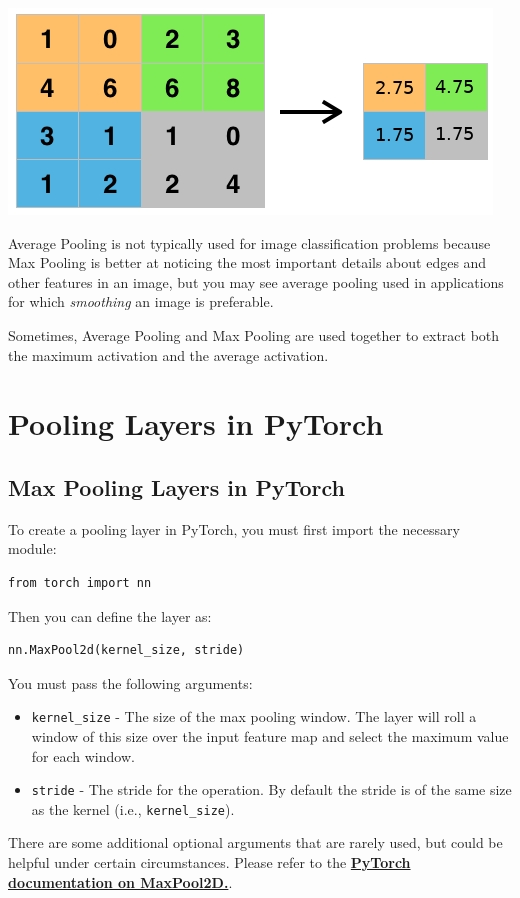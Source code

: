 \includegraphics[width=0.75\linewidth]{img//cnn//depth/average-pooling.jpeg}

Average Pooling is not typically used for image classification problems because Max Pooling is better at noticing the most important details about edges and other features in an image, but you may see average pooling used in applications for which \textit{smoothing} an image is preferable. \newline

Sometimes, Average Pooling and Max Pooling are used together to extract both the maximum activation and the average activation.

\section{Pooling Layers in PyTorch}

\subsection{Max Pooling Layers in PyTorch}

To create a pooling layer in PyTorch, you must first import the necessary module:

\begin{lstlisting}
from torch import nn
\end{lstlisting}
Then you can define the layer as:
\begin{lstlisting}
nn.MaxPool2d(kernel_size, stride)
\end{lstlisting}
You must pass the following arguments:

\begin{itemize}
    \item \lstinline{kernel_size} - The size of the max pooling window. The layer will roll a window of this size over the input feature map and select the maximum value for each window.
    \item \lstinline|stride| - The stride for the operation. By default the stride is of the same size as the kernel (i.e., \lstinline{kernel_size}).
\end{itemize}
There are some additional optional arguments that are rarely used, but could be helpful under certain circumstances. Please refer to the \href{https://pytorch.org/docs/stable/generated/torch.nn.MaxPool2d.html}{\textbf{PyTorch documentation on MaxPool2D.}}.

